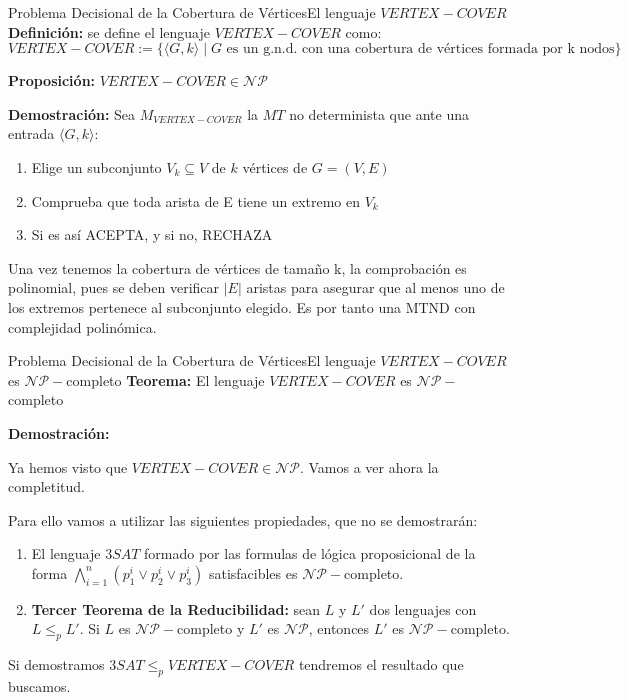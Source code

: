 \documentclass[10pt, envcountsect, presentation, aspectratio=169]{beamer}
\begin{document}
\begin{frame}{Problema Decisional de la Cobertura de Vértices}{El lenguaje $VERTEX-COVER$}
    \textbf{Definición:} se define el lenguaje $VERTEX-COVER$ como:
    $$
    VERTEX-COVER:=\{\langle G, k \rangle \mid G \text{ es un g.n.d. con una cobertura de vértices formada por k nodos}\}
    $$
    

    \textbf{Proposición:} $VERTEX-COVER \in \mathcal{NP}$

    \textbf{Demostración: } Sea $M_{VERTEX-COVER}$ la $MT$ no determinista que ante una entrada $\langle G, k \rangle$:

    \begin{enumerate}[I]
        \item Elige un subconjunto $V_k \subseteq V$ de $k$ vértices de $G=(V,E)$
        \item Comprueba que toda arista de E tiene un extremo en $V_k$
        \item Si es así ACEPTA, y si no, RECHAZA
    \end{enumerate}

    Una vez tenemos la cobertura de vértices de tamaño k, la comprobación es polinomial, pues se deben verificar $|E|$ aristas para asegurar que al menos uno de los extremos pertenece al subconjunto elegido.
    Es por tanto una MTND con complejidad polinómica.

\end{frame}

\begin{frame}{Problema Decisional de la Cobertura de Vértices}{El lenguaje $VERTEX-COVER$ es $\mathcal{NP}-$completo }
    \textbf{Teorema:} El lenguaje $VERTEX-COVER$ es $ \mathcal{NP}-$completo
    

    \textbf{Demostración: } 
    
    Ya hemos visto que $VERTEX-COVER \in \mathcal{NP}$. Vamos a ver ahora la completitud. 
    
    Para ello vamos a utilizar las siguientes propiedades, que no se demostrarán:
    \begin{enumerate}[1]
        \item El lenguaje $3SAT$ formado por las formulas de lógica proposicional de la forma $\bigwedge_{i=1}^n(p_1^i \vee p_2^i \vee p_3^i)$ satisfacibles es $\mathcal{NP}-$completo.
        \item \textbf{Tercer Teorema de la Reducibilidad:} sean $L$ y $L'$ dos lenguajes con $L \leq_p L'$. Si $L$ es $\mathcal{NP}-$completo y $L'$ es $\mathcal{NP}$, entonces $L'$ es $\mathcal{NP}-$completo. 
    \end{enumerate}
    Si demostramos $3SAT \leq_p VERTEX-COVER$ tendremos el resultado que buscamos. 
    

\end{frame}
\end{document}
